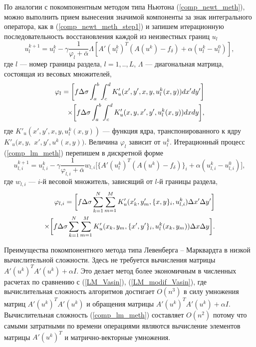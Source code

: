 По аналогии с покомпонентным методом типа Ньютона (\ref{comp_newt_meth}), можно выполнить прием вынесения значимой компоненты за знак интегрального оператора, как в (\ref{comp_newt_meth_step1}) и запишем итерационную последовательность восстановления каждой из неизвестных границ $u_l$
\begin{equation}\label{comp_lm_meth}
u_l^{k+1}=u_l^k-\gamma\frac{1}{\varphi_l+\bar{\alpha}}\Lambda[ A'(u_l^k)^T(A(u^k)-f_\delta)+\alpha (u_l^k-u_l^0)],
\end{equation}
где $l$ --- номер границы раздела, $l=1,..,L$, $\Lambda$ --- диагональная матрица, состоящая из весовых множителей, 
\begin{equation*}
\begin{aligned}
\varphi_l=\bigg[ f\Delta\sigma\int_{a}^{b}\int_{c}^{d}
K'_u(x',y', x, y, u_l^k(x,y))dx'dy'\bigg] \notag \\ \times\bigg[f\Delta\sigma\int_{a}^{b}\int_{c}^{d}K'_u(x,y, x',y',u_l^k(x,y))dxdy\bigg], 
\end{aligned}
\end{equation*} 
где $K'_u(x',y', x, y, u_l^k(x,y))$ --- функция ядра, транспонированного к ядру $K'_u(x,y,$ $ x',y',u^k(x,y))$. Величина $\varphi_l$ зависит от $u_l^k$.
Итерационный процесс (\ref{comp_lm_meth}) перепишем в дискретной форме
\begin{equation}\label{comp_lm_meth_disc}
u_{l,i}^{k+1}=u_{l,i}^k-\gamma\frac{1}{\varphi_{l,i}+\bar{\alpha}}w_{l,i}\bigg[ \{A'(u_l^k)^T(A(u^k)-f_\delta)\}_i+\alpha (u_{l,i}^k-u_{l,i}^0)\bigg],
\end{equation}
где $w_{l,i}$ --- $i$-й весовой множитель, зависящий от $l$-й границы раздела,
\begin{equation*}
\begin{aligned}
\varphi_{l,i}=\bigg[ f\Delta\sigma\sum\limits_{k=1}^{N}
\sum\limits_{m=1}^{M}
K'_u(x'_k,y'_m, \{x, y\}_i, u_{l,i}^k) \Delta x' \Delta y'\bigg] \notag \\ \times\bigg[f\Delta\sigma\sum\limits_{k=1}^{N}
\sum\limits_{m=1}^{M}K'_u(x_k,y_m, \{x',y'\}_i,u_l^k(x_k,y_m))\Delta x \Delta y\bigg]. 
\end{aligned}
\end{equation*}

Преимущества покомпонентного метода типа Левенберга -- Марквардта в низкой вычислительной сложности. Здесь не требуется вычисления матрицы $A'(u^k)^T A'(u^k)+\alpha I$. Это делает метод более экономичным в численных расчетах по сравнению с (\ref{LM_Vasin}), (\ref{LM_modif_Vasin}), где вычислительная сложность алгоритмов достигает $O(n^3)$ в силу умножения матриц $A'(u^k)^T A'(u^k)$ и обращения матрицы $A'(u^k)^T A'(u^k)+\alpha I$. Вычислительная сложность (\ref{comp_lm_meth}) составляет $O(n^2)$ потому что самыми затратными по времени операциями являются вычисление элементов матрицы $A'(u^k)^T$ и матрично-векторные умножения.


